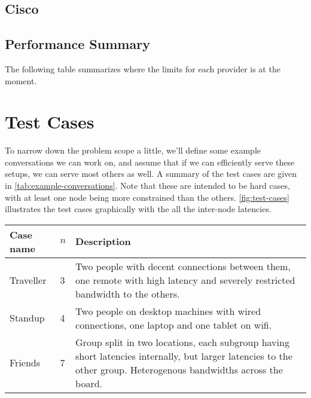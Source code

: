 \subsection{Cisco}


\subsection{Performance Summary}

The following table summarizes where the limits for each provider is at the moment.



\section{Test Cases}

To narrow down the problem scope a little, we'll define some example conversations we can work on, and assume that if we can efficiently serve these setups, we can serve most others as well. A summary of the test cases are given in \autoref{tab:example-conversations}. Note that these are intended to be hard cases, with at least one node being more constrained than the others. \autoref{fig:test-cases} illustrates the test cases graphically with the all the inter-node latencies.

\begin{center}
    \label{tab:example-conversations}
    \begin{tabular}{| l | l | p{7cm} |}
    \hline
    \textbf{Case name} & \textbf{$n$} & \textbf{Description} \\ \hline
    Traveller & 3 & Two people with decent connections between them, one remote with high latency and severely restricted bandwidth to the others. \\ \hline
    Standup & 4 & Two people on desktop machines with wired connections, one laptop and one tablet on wifi. \\ \hline
    Friends & 7 & Group split in two locations, each subgroup having short latencies internally, but larger latencies to the other group. Heterogenous bandwidths across the board. \\ \hline
    \end{tabular}
\end{center}

